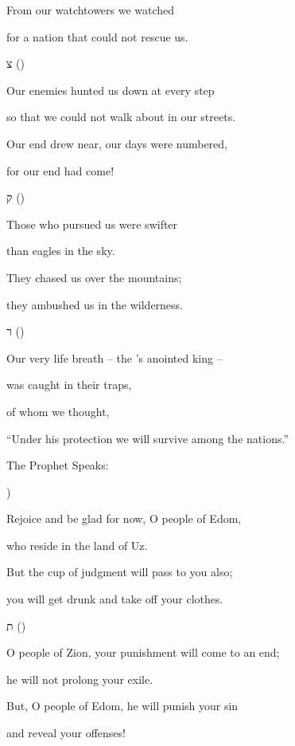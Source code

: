 {\par }{\Q From our watchtowers we
watched
\par }{\Q for a
nation that could
not rescue us.
\par }{\SH צ ({})
\par }{\Q {}Our enemies hunted us down at every step
\par }{\Q so that we could not walk about in our streets.
\par }{\Q Our end drew near, our days were numbered,
\par }{\Q for our end had come!
\par }{\SH ק ({})
\par }{\Q {}Those who pursued us were swifter
\par }{\Q than eagles in the sky.
\par }{\Q They chased us over the mountains;
\par }{\Q they ambushed us in the wilderness.
\par }{\SH ר ({})
\par }{\Q {}Our very life breath – the
{}’s anointed king –
\par }{\Q was caught in their traps,
\par }{\Q of whom we thought,
\par }{\Q “Under his protection we will survive among the nations.”
\par }{\SH The Prophet Speaks:
\par }{\SH 
{})
\par }{\Q {}Rejoice
and be glad
for now, O people
of Edom,
\par }{\Q who reside in
the land
of Uz.
\par }{\Q But the cup
of judgment will pass
to you also;
\par }{\Q you will get drunk
and take off your clothes.
\par }{\SH ת ({})
\par }{\Q {}O people of Zion, your punishment will come to an end;
\par }{\Q he will not prolong your exile.
\par }{\Q But, O people of Edom, he will punish your sin
\par }{\Q and reveal your offenses!

\par }
